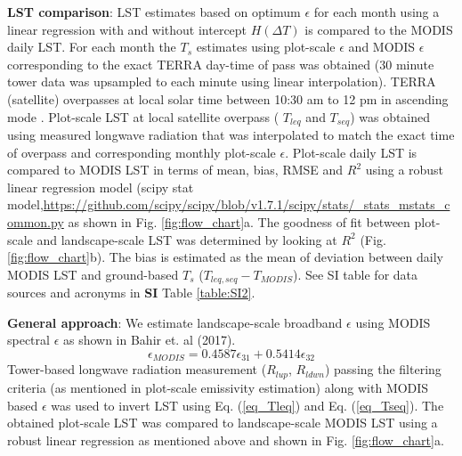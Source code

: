 \documentclass[fleqn,10pt]{wlscirep}
\begin{document}
{{\textbf{LST comparison}: LST estimates based on optimum $\epsilon$ for each month using a linear regression with and without intercept $H(\Delta T)$ is compared to the MODIS daily LST. For each month the $T_{s}$ estimates using plot-scale $\epsilon$ and MODIS $\epsilon$ corresponding to the exact TERRA day-time of pass was obtained (30 minute tower data was upsampled to each minute using linear interpolation). TERRA (satellite) overpasses at local solar time between 10:30 am to 12 pm in ascending mode \cite{guillevic2017land}. Plot-scale LST at local satellite overpass ( $T_{leq}$ and $T_{seq}$) was obtained using measured longwave radiation that was interpolated to match the exact time of overpass and corresponding monthly plot-scale $\epsilon$. Plot-scale daily LST is compared to MODIS LST in terms of mean, bias, RMSE and $R^2$ using a robust linear regression model (scipy stat model,\url{https://github.com/scipy/scipy/blob/v1.7.1/scipy/stats/_stats_mstats_common.py} 
 as shown in Fig. \ref{fig:flow_chart}a. The goodness of fit between plot-scale and landscape-scale LST was determined by looking at $R^2$ (Fig. \ref{fig:flow_chart}b). The bias is estimated as the mean of deviation between daily MODIS LST and ground-based $T_{s}$ ($T_{leq,seq} - T_{MODIS}$). See SI table for data sources and acronyms in \textbf{SI} Table \ref{table:SI2}.



\textbf{General approach}:
We estimate landscape-scale broadband $\epsilon$ using MODIS spectral $\epsilon$ as shown in Bahir et. al (2017)\cite{bahir2017evaluation}.
\begin{equation}\label{eq_emodis}
\epsilon_{MODIS}= 0.4587 \epsilon_{31} + 0.5414 \epsilon_{32}
\end{equation}
Tower-based longwave radiation measurement ($R_{lup}$, $R_{ldwn}$) passing the filtering criteria (as mentioned in plot-scale emissivity estimation) along with MODIS based $\epsilon$ was used to invert LST using Eq. (\ref{eq_Tleq}) and  Eq. (\ref{eq_Tseq}). The obtained plot-scale LST was compared to landscape-scale MODIS LST using a robust linear regression as mentioned above and shown in Fig. \ref{fig:flow_chart}a.



}}
\end{document}
